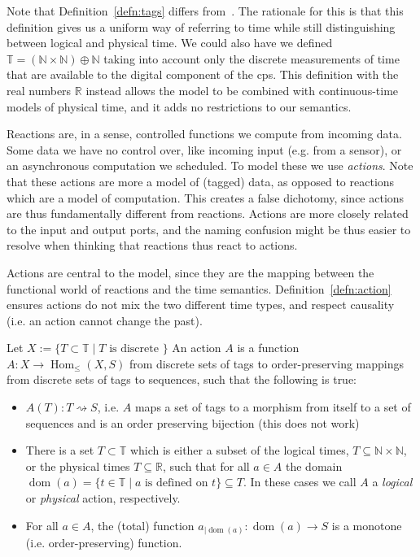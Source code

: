Note that Definition~\ref{defn:tags} differs from~\cite{lohstroh_cyphy19,lohstroh_phdthesis}.
The rationale for this is that this definition gives us a uniform way of referring to time while still distinguishing between logical and physical time.
We could also have we defined $\mathbb{T} = (\mathbb{N} \times \mathbb{N}) \oplus \mathbb{N}$ taking into account only the discrete measurements of time that are available to the digital component of the \ac{cps}.
This definition with the real numbers $\mathbb{R}$ instead allows the model to be combined with continuous-time models of physical time, and it adds no restrictions to our semantics.

Reactions are, in a sense, controlled functions we compute from incoming data. 
Some data we have no control over, like incoming input (e.g. from a sensor), or an asynchronous computation we scheduled.
To model these we use \emph{actions}.
Note that these actions are more a model of (tagged) data, as opposed to reactions which are a model of computation.
This creates a false dichotomy, since actions are thus fundamentally different from reactions.
Actions are more closely related to the input and output ports, and the naming confusion might be thus easier to resolve when thinking that reactions thus react to actions.

Actions are central to the model, since they are the mapping between the functional world of reactions and the time semantics. 
Definition~\ref{defn:action} ensures actions do not mix the two different time types, and respect causality (i.e. an action cannot change the past).

\begin{defn}
    \label{defn:action}
Let $X := \{ T \subset \mathbb{T} \mid T \text{ is discrete }  \} $
 An action $A$ is a function $A: X  \rightarrow \operatorname{Hom}_{\leq}(X,S)$ from discrete sets of tags to order-preserving mappings from discrete sets of tags to sequences, such that the following is true:
\begin{itemize}
    \item $A(T) : T \rightsquigarrow S$, i.e. $A$ maps a set of tags to a morphism from itself to a set of sequences and is an order preserving bijection (this does not work)
    \item There is a set $T \subset \mathbb{T}$ which is either a subset of the logical times, $T \subseteq \mathbb{N} \times \mathbb{N}$, or the physical times $T \subseteq \mathbb{R}$, such that for all $a \in A$ the domain $\operatorname{dom}(a) = \{ t \in \mathbb{T} \mid a \text{ is defined on } t \} \subseteq T$.
    In these cases we call $A$ a \emph{logical} or \emph{physical} action, respectively.
    \item For all $a \in A$, the (total) function $a_{\big| \operatorname{dom}(a)}:\operatorname{dom}(a) \rightarrow S$ is a monotone (i.e. order-preserving) function.
\end{itemize}
\end{defn}

